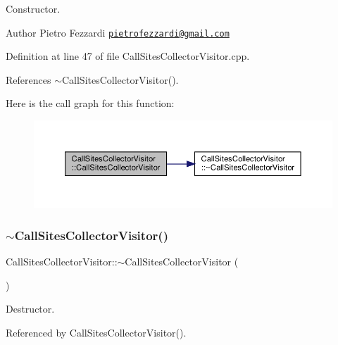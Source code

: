 Constructor. 

\begin{DoxyAuthor}{Author}
Pietro Fezzardi \href{mailto:pietrofezzardi@gmail.com}{\tt pietrofezzardi@gmail.\+com} 
\end{DoxyAuthor}


Definition at line 47 of file Call\+Sites\+Collector\+Visitor.\+cpp.



References $\sim$\+Call\+Sites\+Collector\+Visitor().

Here is the call graph for this function\+:
\nopagebreak
\begin{figure}[H]
\begin{center}
\leavevmode
\includegraphics[width=350pt]{d2/da7/classCallSitesCollectorVisitor_af0464f236c4fb81f79fe157d31e30116_cgraph}
\end{center}
\end{figure}
\mbox{\label{classCallSitesCollectorVisitor_a93aae645aa234551c112786f96bcabfb}} 
\subsubsection{\texorpdfstring{$\sim$\+Call\+Sites\+Collector\+Visitor()}{~CallSitesCollectorVisitor()}}
{\footnotesize\ttfamily Call\+Sites\+Collector\+Visitor\+::$\sim$\+Call\+Sites\+Collector\+Visitor (\begin{DoxyParamCaption}{ }\end{DoxyParamCaption})\hspace{0.3cm}{\ttfamily [default]}}



Destructor. 



Referenced by Call\+Sites\+Collector\+Visitor().

